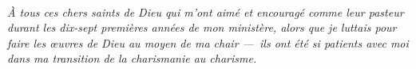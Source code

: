 \newpage
\mbox{}
\vfill
\parbox{4in}{
\begin{center}
\HRule \\[0.4cm]
\emph{À tous ces chers saints de Dieu qui m'ont aimé et encouragé comme leur
 pasteur durant les dix-sept premières années de mon ministère, alors que je
 luttais pour faire les œuvres de Dieu au moyen de ma chair ---~ils ont été
 si patients avec moi dans ma transition de la charismanie au charisme.}
\HRule \\[1.5cm]
\end{center}
}
\vfill
\mbox{}
\newpage


